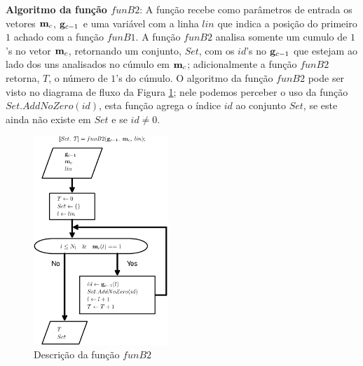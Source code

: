 \textbf{Algoritmo da função $funB2$}:
A função recebe como parâmetros de entrada os vetores $\VECTOR{m}_{c}$, $\VECTOR{g}_{c-1}$
e uma variável com a linha $lin$ que indica a posição do primeiro $1$ achado com a função $funB1$. 
A função $funB2$ analisa somente um cumulo de $1$'s no vetor $\VECTOR{m}_{c}$, 
retornando um conjunto, $Set$, com os $id$'s no $\VECTOR{g}_{c-1}$ 
que estejam ao lado dos uns analisados no cúmulo em $\VECTOR{m}_{c}$;
adicionalmente a função $funB2$ retorna, $T$, o número de $1$'s do cúmulo.
O algoritmo da função $funB2$ pode ser visto no diagrama de fluxo da Figura \ref{fig:funB2};
nele podemos perceber o uso da função $Set.AddNoZero(id)$,
esta função agrega o índice $id$ ao conjunto $Set$,
se este ainda não existe em $Set$ e se $id\neq 0$.
\begin{figure}[!htb]
\centering
\includegraphics[width=0.45\textwidth]{section-cumulos/funB2.eps}
\caption{Descrição da função $funB2$ }
\label{fig:funB2}
\end{figure}


